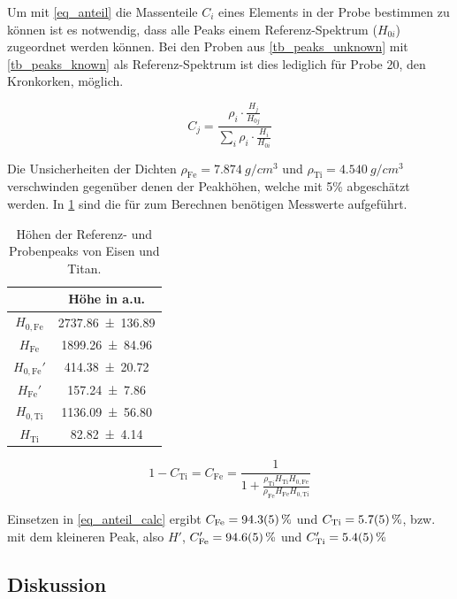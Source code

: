 \documentclass[
	a4paper,
	12pt,
	pagesize,
	ngerman
]{scrartcl}
\begin{document}
	Um mit \cref{eq_anteil} die Massenteile $C_i$ eines Elements in der Probe bestimmen zu können ist es notwendig, dass alle Peaks einem Referenz-Spektrum ($H_{0i}$) zugeordnet werden können.
	Bei den Proben aus \cref{tb_peaks_unknown} mit \cref{tb_peaks_known} als Referenz-Spektrum ist dies lediglich für Probe 20, den Kronkorken, möglich.

	\begin{equation}
		\label{eq_anteil}
		C_j = \frac{\rho_i \cdot \frac{H_j}{H_{0j}}}{\sum_{i} \rho_i \cdot \frac{H_i}{H_{0i}}}
	\end{equation}

	Die Unsicherheiten der Dichten $\rho_\text{Fe}=\SI{7.874}{g/cm^3}$ und $\rho_\text{Ti}=\SI{4.540}{g/cm^3}$ verschwinden gegenüber denen der Peakhöhen, welche mit 5\% abgeschätzt werden. \cite{density}
	In \cref{tb_peaks} sind die für zum Berechnen benötigen Messwerte aufgeführt.

	\begin{table}[H]
		\centering
		\begin{tabular}{ c | c }
			 & Höhe in a.u.\\ \hline \hline
			$H_{0 , \text{Fe}}$ & \SI{2737.86+-136.89}{} \\
			$H_{\text{Fe}}$ & \SI{1899.26+-84.96}{} \\
			$H_{0 , \text{Fe}}'$ & \SI{414.38+-20.72}{} \\
			$H_{\text{Fe}}'$ & \SI{157.24+-7.86}{} \\
			$H_{0 , \text{Ti}}$ & \SI{1136.09+-56.80}{} \\
			$H_{\text{Ti}}$ & \SI{82.82+-4.14}{} \\
		\end{tabular}
		\caption{Höhen der Referenz- und Probenpeaks von Eisen und Titan.} %
		\label{tb_peaks}
	\end{table}

	\begin{equation}
		\label{eq_anteil_calc}
		1-C_\text{Ti}= C_\text{Fe} = \frac{1}{1+ \frac{\rho_\text{Ti} H_\text{Ti} H_{0,\text{Fe}}}{\rho_\text{Fe} H_\text{Fe} H_{0,\text{Ti}}}}
	\end{equation}

	Einsetzen in \cref{eq_anteil_calc} ergibt $C_\text{Fe}=\SI{94.3+-0.5}{\%}$ und $C_\text{Ti}=\SI{5.7+-0.5}{\%}$, bzw. mit dem kleineren Peak, also $H'$, $C_\text{Fe}'=\SI{94.6+-0.5}{\%}$ und $C_\text{Ti}'=\SI{5.4+-0.5}{\%}$

	\subsection{Diskussion}
\end{document}
